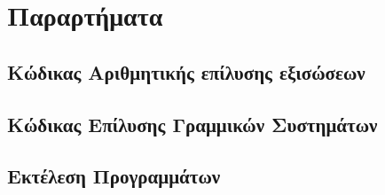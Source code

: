 \documentclass[assignment2.tex]{subfiles}
\begin{document}
\section*{Παραρτήματα}
\subsection*{Κώδικας Αριθμητικής επίλυσης εξισώσεων}


\subsection*{Κώδικας Επίλυσης Γραμμικών Συστημάτων}


\subsection*{Εκτέλεση Προγραμμάτων}

\end{document}
